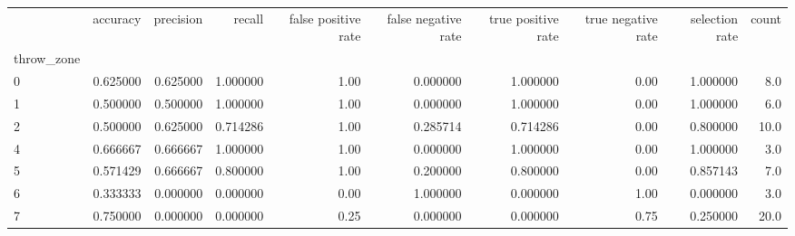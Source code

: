 \begin{tabular}{lrrrrrrrrr}
\toprule
{} &  accuracy &  precision &    recall &  false positive rate &  false negative rate &  true positive rate &  true negative rate &  selection rate &  count \\
throw\_zone &           &            &           &                      &                      &                     &                     &                 &        \\
\midrule
0          &  0.625000 &   0.625000 &  1.000000 &                 1.00 &             0.000000 &            1.000000 &                0.00 &        1.000000 &    8.0 \\
1          &  0.500000 &   0.500000 &  1.000000 &                 1.00 &             0.000000 &            1.000000 &                0.00 &        1.000000 &    6.0 \\
2          &  0.500000 &   0.625000 &  0.714286 &                 1.00 &             0.285714 &            0.714286 &                0.00 &        0.800000 &   10.0 \\
4          &  0.666667 &   0.666667 &  1.000000 &                 1.00 &             0.000000 &            1.000000 &                0.00 &        1.000000 &    3.0 \\
5          &  0.571429 &   0.666667 &  0.800000 &                 1.00 &             0.200000 &            0.800000 &                0.00 &        0.857143 &    7.0 \\
6          &  0.333333 &   0.000000 &  0.000000 &                 0.00 &             1.000000 &            0.000000 &                1.00 &        0.000000 &    3.0 \\
7          &  0.750000 &   0.000000 &  0.000000 &                 0.25 &             0.000000 &            0.000000 &                0.75 &        0.250000 &   20.0 \\
\bottomrule
\end{tabular}
